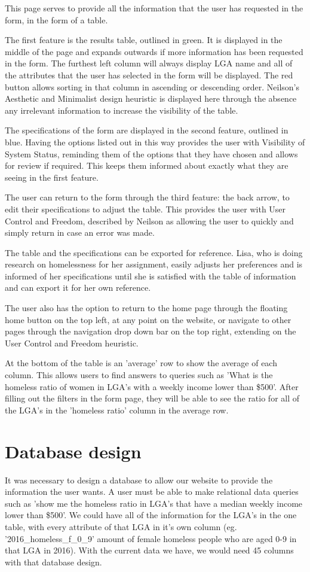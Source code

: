 \documentclass[12pt, a4paper]{article}
\begin{document}
This page serves to provide all the information that the user has requested in the form, in the form of a table.

The first feature is the results table, outlined in green. It is displayed in the middle of the page and expands outwards if more information has been requested in the form. The furthest left column will always display LGA name and all of the attributes that the user has selected in the form will be displayed. The red button allows sorting in that column in ascending or descending order. Neilson’s Aesthetic and Minimalist design heuristic is displayed here through the absence any irrelevant information to increase the visibility of the table.

The specifications of the form are displayed in the second feature, outlined in blue. Having the options listed out in this way provides the user with Visibility of System Status, reminding them of the options that they have chosen and allows for review if required. This keeps them informed about exactly what they are seeing in the first feature.

The user can return to the form through the third feature: the back arrow, to edit their specifications to adjust the table. This provides the user with User Control and Freedom, described by Neilson as allowing the user to quickly and simply return in case an error was made.

The table and the specifications can be exported for reference. Lisa, who is doing research on homelessness for her assignment, easily adjusts her preferences and is informed of her specifications until she is satisfied with the table of information and can export it for her own reference.

The user also has the option to return to the home page through the floating home button on the top left, at any point on the website, or navigate to other pages through the navigation drop down bar on the top right, extending on the User Control and Freedom heuristic.

At the bottom of the table is an 'average' row to show the average of each column. This allows users to find answers to queries such as 'What is the homeless ratio of women in LGA's with a weekly income lower than \$500'. After filling out the filters in the form page, they will be able to see the ratio for all of the LGA's in the 'homeless ratio' column in the average row.
\section{Database design}
It was necessary to design a database to allow our website to provide the information the user wants. A user must be able to make relational data queries such as 'show me the homeless ratio in LGA's that have a median weekly income lower than \$500'. We could have all of the information for the LGA's in the one table, with every attribute of that LGA in it's own column (eg. '2016\_homeless\_f\_0\_9' amount of female homeless people who are aged 0-9 in that LGA in 2016). With the current data we have, we would need 45 columns with that database design. 
\end{document}

